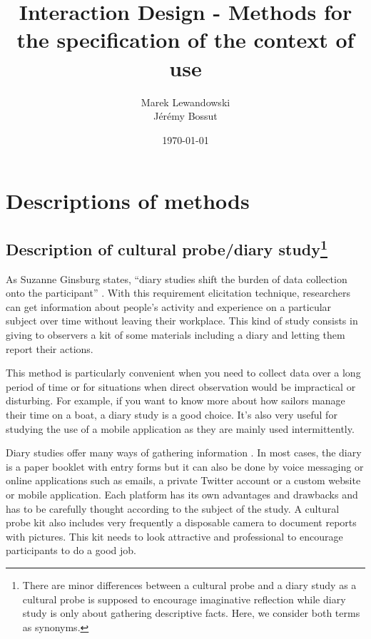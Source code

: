 \documentclass[12pt, a4paper]{article}
\author{Marek Lewandowski \\ Jérémy Bossut}
\date{\today}
\title{Interaction Design - Methods for the specification of the context of use}
\begin{document}
\maketitle
\newpage

\section{Descriptions of methods}

\subsection{Description of cultural probe/diary study\protect\footnote{There are minor differences between a cultural probe and a diary study as a cultural probe is supposed to encourage imaginative reflection while diary study is only about gathering descriptive facts. Here, we consider both terms as synonyms.}}
 
As Suzanne Ginsburg states, “diary studies shift the burden of data collection onto the participant” \cite{ginsburg_designing_2010}. With this requirement elicitation technique, researchers can get information about people's activity and experience on a particular subject over time without leaving their workplace. This kind of study consists in giving to observers a kit of some materials including a diary and letting them report their actions.

This method is particularly convenient when you need to collect data over a long period of time or for situations when direct observation would be impractical or disturbing. For example, if you want to know more about how sailors manage their time on a boat, a diary study is a good choice. It’s also very useful for studying the use of a mobile application as they are mainly used intermittently.

Diary studies offer many ways of gathering information \cite{webcredible}. In most cases, the diary is a paper booklet with entry forms but it can also be done by voice messaging or online applications such as emails, a private Twitter account or a custom website or mobile application. Each platform has its own advantages and drawbacks and has to be carefully thought according to the subject of the study. A cultural probe kit also includes very frequently a disposable camera to document reports with pictures. This kit needs to look attractive and professional to encourage participants to do a good job.
\end{document}
